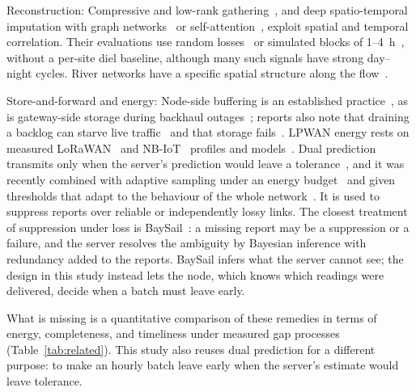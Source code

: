Reconstruction: Compressive and low-rank gathering~\cite{luo2009cdg,cheng2013stcdg,piao2014lowrank}, and deep spatio-temporal imputation with graph networks~\cite{cini2022grin,marisca2022spin,cao2020stemgnn,jing2024casper} or self-attention~\cite{du2023saits,nie2024imputeformer}, exploit spatial and temporal correlation. Their evaluations use random losses~\cite{chang2023deepcs} or simulated blocks of 1--4~h~\cite{cini2022grin,marisca2022spin}, without a per-site diel baseline, although many such signals have strong day--night cycles. River networks have a specific spatial structure along the flow~\cite{peterson2010mixed}.

Store-and-forward and energy: Node-side buffering is an established practice~\cite{ledinh2007design,langendoen2006murphy,mcdonald2007sendt,murphy2021arctic,puluckul2025subarctic}, as is gateway-side storage during backhaul outages~\cite{zennaro2025kyrgyzstan}; reports also note that draining a backlog can starve live traffic~\cite{ingelrest2010sensorscope} and that storage fails~\cite{murphy2021arctic}. LPWAN energy rests on measured LoRaWAN~\cite{casals2017lorawan} and NB-IoT~\cite{michelinakis2021dissecting,sorensen2022nbiot} profiles and models~\cite{azari2019nbiot,ugwuanyi2021developing}. Dual prediction transmits only when the server's prediction would leave a tolerance~\cite{dias2016survey,santini2006adaptive}, and it was recently combined with adaptive sampling under an energy budget~\cite{arnaiz2024adaptive} and given thresholds that adapt to the behaviour of the whole network~\cite{martinezsanchez2025sod}. It is used to suppress reports over reliable or independently lossy links. The closest treatment of suppression under loss is BaySail~\cite{silberstein2007baysail}: a missing report may be a suppression or a failure, and the server resolves the ambiguity by Bayesian inference with redundancy added to the reports. BaySail infers what the server cannot see; the design in this study instead lets the node, which knows which readings were delivered, decide when a batch must leave early.

What is missing is a quantitative comparison of these remedies in terms of energy, completeness, and timeliness under measured gap processes (Table~\ref{tab:related}). This study also reuses dual prediction for a different purpose: to make an hourly batch leave early when the server's estimate would leave tolerance.

